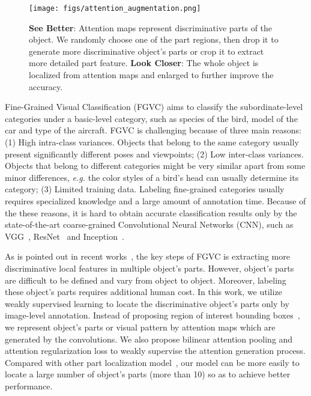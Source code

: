 \documentclass[10pt,twocolumn,letterpaper]{article}
\def\eg{{\em e.g. }}
\begin{document}
\begin{figure}[t]
    \begin{center}
        \texttt{[image: figs/attention\_augmentation.png]}
    \end{center}
    \caption{\small \textbf{See Better}: Attention maps represent discriminative parts of the object. We randomly choose one of the part regions, then drop it to generate more discriminative object's parts or crop it to extract more detailed part feature. \textbf{Look Closer}: The whole object is localized from attention maps and enlarged to further improve the accuracy.}
    \label{fig:attention_augmentation}
\end{figure}

Fine-Grained Visual Classification (FGVC) aims to classify the subordinate-level categories under a basic-level category, such as species of the bird,  model of the car and type of the aircraft. FGVC is challenging because of three main reasons: (1) High intra-class variances. Objects that belong to the same category usually present significantly different poses and viewpoints; (2) Low inter-class variances. Objects that belong to different categories might be very similar apart from some minor differences, \eg the color styles of a bird's head can usually determine its category; (3) Limited training data. Labeling fine-grained categories usually requires specialized knowledge and a large amount of annotation time. Because of the these reasons, it is hard to obtain accurate classification results only by the state-of-the-art coarse-grained Convolutional Neural Networks (CNN), such as VGG~\cite{vgg}, ResNet~\cite{resnet} and Inception~\cite{inception}.

As is pointed out in recent works~\cite{ra-cnn, ma-cnn, mask-cnn}, the key steps of FGVC is extracting more discriminative local features in multiple object's parts. However, object's parts are difficult to be defined and vary from object to object. Moreover, labeling these object's parts requires additional human cost. In this work, we utilize weakly supervised learning to locate the discriminative object's parts only by image-level annotation. Instead of proposing region of interest bounding boxes~\cite{wsddn,ra-cnn}, we represent object's parts or visual pattern by attention maps which are generated by the convolutions. We also propose bilinear attention pooling and attention regularization loss to weakly supervise the attention generation process. Compared with other part localization model~\cite{ma-cnn,mask-cnn}, our model can be more easily to locate a large number of object's parts (more than 10) so as to achieve better performance.
\end{document}
